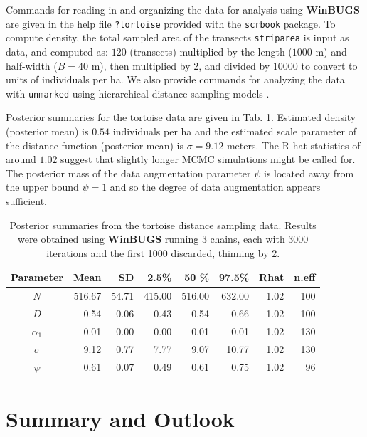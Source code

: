 Commands for reading in and organizing the data for analysis using
{\bf WinBUGS} are given in the help file \mbox{\tt ?tortoise} provided
with the \mbox{\tt scrbook} package.  To compute density, the total
sampled area of the transects \mbox{\tt striparea} is input as data,
and computed as: $120$ (transects) multiplied by the length ($1000$ m)
and half-width ($B=40$ m), then multiplied by 2, and divided by
$10000$ to convert to units of individuals per ha.  We also provide
commands for analyzing the data with \mbox{\tt unmarked}
\citep{fiske_chandler:2011} using hierarchical distance sampling
models \citep{royle_etal:2004}.


Posterior summaries for the tortoise data are given in Tab. \ref{closed.tab.dsamp}.
Estimated density (posterior mean) is $0.54$ individuals
  per ha and the estimated scale parameter of the distance function
(posterior mean) is $\sigma=9.12$ meters.  The R-hat statistics of
around $1.02$ suggest that slightly longer MCMC simulations might be
called for. The posterior mass of the data augmentation parameter $\psi$
is located away from the upper bound $\psi=1$ and so the degree of
data augmentation appears sufficient.

\begin{table}[ht]
  \caption{
    Posterior summaries from the tortoise distance sampling data. Results
    were obtained using {\bf WinBUGS}
    running
    3 chains, each with 3000 iterations and the first 1000 discarded,
    thinning by 2.
  }
\begin{tabular}{crrrrrrr} \hline \hline
Parameter & Mean &   SD  & 2.5\%   &  50 \%  &   97.5\% &Rhat& n.eff
 \\ \hline
$N$       & 516.67& 54.71 & 415.00 & 516.00  & 632.00& 1.02&   100  \\
$D$       &   0.54&  0.06 &  0.43  & 0.54    &   0.66 &1.02&   100 \\
$\alpha_1$ &  0.01&  0.00 &   0.00 &  0.01   &   0.01 &1.02&   130   \\
$\sigma$  &   9.12&  0.77 &   7.77 &   9.07  &  10.77& 1.02&   130  \\
$\psi$    &   0.61&  0.07 &  0.49  & 0.61    &   0.75 &1.02&    96  \\ \hline
\end{tabular}
\label{closed.tab.dsamp}
\end{table}



\section{Summary and Outlook}

